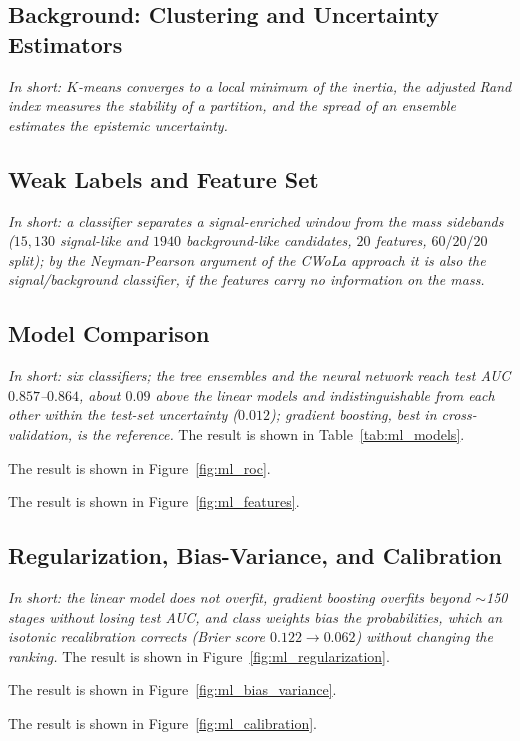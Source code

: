 \subsection{Background: Clustering and Uncertainty Estimators}
\emph{In short: $K$-means converges to a local minimum of the inertia, the adjusted Rand index measures the stability of a partition, and the spread of an ensemble estimates the epistemic uncertainty.}

\subsection{Weak Labels and Feature Set}
\label{sec:ml_labels}
\emph{In short: a classifier separates a signal-enriched window from the mass sidebands ($15{,}130$ signal-like and $1940$ background-like candidates, $20$ features, $60/20/20$ split); by the Neyman-Pearson argument of the CWoLa approach it is also the signal/background classifier, if the features carry no information on the mass.}

\subsection{Model Comparison}
\label{sec:ml_models}
\emph{In short: six classifiers; the tree ensembles and the neural network reach test AUC $0.857$--$0.864$, about $0.09$ above the linear models and indistinguishable from each other within the test-set uncertainty ($0.012$); gradient boosting, best in cross-validation, is the reference.}
The result is shown in Table~\ref{tab:ml_models}.

The result is shown in Figure~\ref{fig:ml_roc}.

The result is shown in Figure~\ref{fig:ml_features}.

\subsection{Regularization, Bias-Variance, and Calibration}
\label{sec:ml_regcal}
\emph{In short: the linear model does not overfit, gradient boosting overfits beyond $\sim$150 stages without losing test AUC, and class weights bias the probabilities, which an isotonic recalibration corrects (Brier score $0.122\to0.062$) without changing the ranking.}
The result is shown in Figure~\ref{fig:ml_regularization}.

The result is shown in Figure~\ref{fig:ml_bias_variance}.

The result is shown in Figure~\ref{fig:ml_calibration}.

